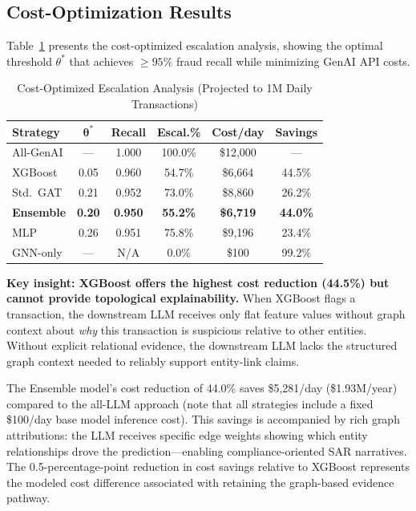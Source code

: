 \documentclass[journal]{IEEEtran}
\begin{document}
\subsection{Cost-Optimization Results}

Table~\ref{tab:cost} presents the cost-optimized escalation analysis, showing the optimal threshold $\theta^*$ that achieves $\geq95\%$ fraud recall while minimizing GenAI API costs.

\begin{table}[!t]
\centering
\caption{Cost-Optimized Escalation Analysis (Projected to 1M Daily Transactions)}
\label{tab:cost}
\begin{tabular}{lccccc}
\toprule
\textbf{Strategy} & $\boldsymbol{\theta^*}$ & \textbf{Recall} & \textbf{Escal.\%} & \textbf{Cost/day} & \textbf{Savings} \\
\midrule
All-GenAI & --- & 1.000 & 100.0\% & \$12,000 & --- \\
XGBoost & 0.05 & 0.960 & 54.7\% & \$6,664 & 44.5\% \\
Std.\ GAT & 0.21 & 0.952 & 73.0\% & \$8,860 & 26.2\% \\
\textbf{Ensemble} & \textbf{0.20} & \textbf{0.950} & \textbf{55.2\%} & \textbf{\$6,719} & \textbf{44.0\%} \\
MLP & 0.26 & 0.951 & 75.8\% & \$9,196 & 23.4\% \\
GNN-only & --- & N/A & 0.0\% & \$100 & 99.2\% \\
\bottomrule
\end{tabular}
\end{table}

\textbf{Key insight: XGBoost offers the highest cost reduction (44.5\%) but cannot provide topological explainability.} When XGBoost flags a transaction, the downstream LLM receives only flat feature values without graph context about \emph{why} this transaction is suspicious relative to other entities. Without explicit relational evidence, the downstream LLM lacks the structured graph context needed to reliably support entity-link claims.

The Ensemble model's cost reduction of 44.0\% saves \$5,281/day (\$1.93M/year) compared to the all-LLM approach (note that all strategies include a fixed \$100/day base model inference cost). This savings is accompanied by rich graph attributions: the LLM receives specific edge weights showing which entity relationships drove the prediction---enabling compliance-oriented SAR narratives. The 0.5-percentage-point reduction in cost savings relative to XGBoost represents the modeled cost difference associated with retaining the graph-based evidence pathway.
\end{document}
